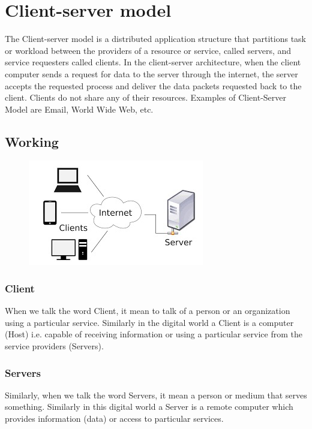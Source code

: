 \documentclass[twocolumn, a4paper]{article}
\begin{document}
\section{Client-server model}
The Client-server model is a distributed application structure that partitions 
task or workload between the providers of a resource or service, called
servers, and service requesters called clients. In the client-server
architecture, when the client computer sends a request for data to the server
through the internet, the server accepts the requested process and deliver the 
data packets requested back to the client. Clients do not share any of their
resources. Examples of Client-Server Model are Email, World Wide Web, etc.
\subsection{Working}

\begin{figure}[h]
  \centering
  \includegraphics[width=\columnwidth]{cliserv}
\end{figure}

\subsubsection{Client}
When we talk the word Client, it mean to talk of a person or an organization
using a particular service. Similarly in the digital world a Client is a
computer (Host) i.e. capable of receiving information or using a particular
service from the service providers (Servers).
\subsubsection{Servers}
Similarly, when we talk the word Servers, it mean a person or medium that
serves something. Similarly in this digital world a Server is a remote computer
which provides information (data) or access to particular services.
\end{document}
